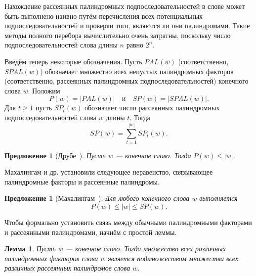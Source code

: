 \documentclass[a4paper,14pt]{extreport}
\theoremstyle{plain}
\newtheorem{lemma}{Лемма}[section]
\newtheorem{proposition}[theorem]{Предложение}
\theoremstyle{definition}
\theoremstyle{remark}
\begin{document}
Нахождение рассеянных палиндромных подпоследовательностей в слове может быть выполнено наивно путём перечисления всех потенциальных подпоследовательностей и проверки того, являются ли они палиндромами. Такие методы полного перебора вычислительно очень затратны, поскольку число подпоследовательностей слова длины $n$ равно $2^n$.

Введём теперь некоторые обозначения. Пусть $PAL(w)$ (соответственно, $SPAL(w)$) обозначает множество всех непустых палиндромных факторов (соответственно, рассеянных палиндромных подпоследовательностей) конечного слова $w$. Положим
\begin{equation}
	P(w) = |PAL(w)| \quad \text{и} \quad SP(w) = |SPAL(w)|.
\end{equation}
Для $t \geq 1$ пусть $SP_t(w)$ обозначает число рассеянных палиндромных подпоследовательностей слова $w$ длины $t$. Тогда
\begin{equation}
	SP(w) = \sum_{t=1}^{|w|} SP_t(w).
\end{equation}

\begin{proposition}[Друбе~\cite{Droubay}]\label{pro.5.3}
	Пусть $w$ --- конечное слово. Тогда $P(w) \leq |w|$.
\end{proposition}

Махалингам и др. установили следующее неравенство, связывающее палиндромные факторы и рассеянные палиндромы.

\begin{proposition}[Махалингам~\cite{Mahalingam}]
	Для любого конечного слова $w$ выполняется
	\begin{equation}
		P(w) \leq |w| \leq SP(w).
	\end{equation}
\end{proposition}

Чтобы формально установить связь между обычными палиндромными факторами и рассеянными палиндромами, начнём с простой леммы.

\begin{lemma}\label{lem:pal_subset_spal}
	Пусть $w$ --- конечное слово. Тогда множество всех различных палиндромных факторов слова $w$ является подмножеством множества всех различных рассеянных палиндромов слова $w$.
\end{lemma}
\end{document}
